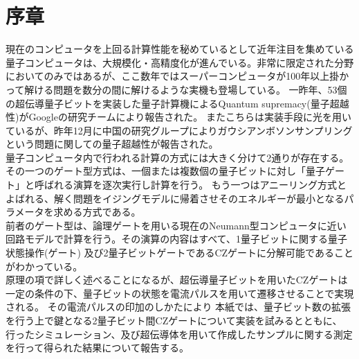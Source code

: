 \section*{序章}

現在のコンピュータを上回る計算性能を秘めているとして近年注目を集めている量子コンピュータは、大規模化・高精度化が進んでいる。非常に限定された分野においてのみではあるが、ここ数年ではスーパーコンピュータが100年以上掛かって解ける問題を数分の間に解けるような実機も登場している。
一昨年、53個の超伝導量子ビットを実装した量子計算機によるQuantum supremacy(量子超越性)がGoogleの研究チームにより報告された。
\cite{arute2019quantum} またこちらは実装手段に光を用いているが、昨年12月に中国の研究グループによりガウシアンボソンサンプリングという問題に関しての量子超越性が報告された。\cite{zhong2020quantum}\\
量子コンピュータ内で行われる計算の方式には大きく分けて2通りが存在する。
その一つのゲート型方式は、一個または複数個の量子ビットに対し「量子ゲート」と呼ばれる演算を逐次実行し計算を行う。
もう一つはアニーリング方式とよばれる、解く問題をイジングモデルに帰着させそのエネルギーが最小となるパラメータを求める方式である。\\
前者のゲート型は、論理ゲートを用いる現在のNeumann型コンピュータに近い回路モデルで計算を行う。その演算の内容はすべて、1量子ビットに関する量子状態操作(ゲート)
及び2量子ビットゲートであるCZゲートに分解可能であることがわかっている。\\
原理の項で詳しく述べることになるが、超伝導量子ビットを用いたCZゲートは一定の条件の下、量子ビットの状態を電流パルスを用いて遷移させることで実現される。
その電流パルスの印加のしかたにより
本紙では、量子ビット数の拡張を行う上で鍵となる2量子ビット間CZゲートについて実装を試みるとともに、
行ったシミュレーション、及び超伝導体を用いて作成したサンプルに関する測定を行って得られた結果について報告する。